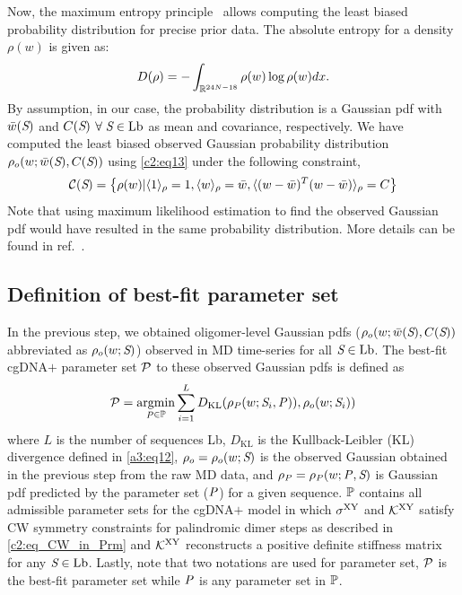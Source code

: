Now, the maximum entropy principle~\cite{jaynes1,jaynes2} allows computing the least biased probability distribution
for precise prior data.
The absolute entropy for a density $\rho(w)$ is given as:
\begin{equation}
D(\rho) = - \int_{\R^{24N-18}} \rho(w) \log \rho(w) dx.
\label{c2:eq13}
\end{equation}
By assumption, in our case, the probability distribution is a Gaussian pdf with $\bar{w}(\sq)$ and $C(\sq)$ $\forall \; \sq \in \text{Lb}$ as mean and covariance, respectively.
We have computed the least biased observed Gaussian probability distribution $\rho_{o}(w;\bar{w}(\sq),C(\sq))$ using \cref{c2:eq13} under the following constraint, 
\begin{equation}
\mathcal{C}(\sq) = \left\{ \rho(w)|\langle 1 \rangle_{\rho}=1, \langle w \rangle_{\rho}=\bar{w}, \langle (w-\bar{w})^{T}(w-\bar{w}) \rangle_{\rho}= C  \right\}
\label{c2:eq14}
\end{equation}
Note that using maximum likelihood estimation to find the observed Gaussian pdf would have resulted in the same probability distribution. More details can be found in ref.~\cite{entropy,patelithesis}.

\subsection{Definition of best-fit parameter set} \label{c2:s4:sb3}
In the previous step, we obtained oligomer-level Gaussian pdfs ($\rho_{o}(w;\bar{w}(\sq),C(\sq))$ abbreviated as $\rho_{o}(w;\sq)$) observed in MD time-series for all $\sq \in \Lb$. 
The best-fit cgDNA$+$ parameter set $\Pc$ to these observed Gaussian pdfs is defined as 
\begin{equation}
\Pc =  \argmin_{\substack \Ptex \in \P} \sum_{i=1}^{L} D_{\text{KL}} (\rho_\Ptex(w;\sq_i, \Ptex)),\rho_{o}(w;\sq_i))
\label{c2:eq17}
\end{equation}
where $L$ is the number of sequences Lb, $D_{\text{KL}}$ is the Kullback-Leibler (KL) divergence defined in \cref{a3:eq12}, $\rho_{o} = \rho_{o}(w; \sq)$ is the observed Gaussian obtained in the previous step from the raw MD data, and $\rho_\Ptex = \rho_\Ptex(w;\Ptex,\sq)$ is
Gaussian pdf predicted by the parameter set ($\Ptex$) for a given sequence.
$\P$ contains all admissible parameter sets for the cgDNA$+$ model in which $\sigma^{\XY}$ and $\K^{\XY}$ satisfy CW symmetry constraints for palindromic dimer steps as described in \cref{c2:eq_CW_in_Prm} and $\K^{\XY}$ reconstructs a positive definite stiffness matrix for any $\sq \in \text{Lb}$. 
Lastly, note that two notations are used for parameter set, $\Pc$ is the best-fit parameter set while $\Ptex$ is any parameter set in $\P$.

